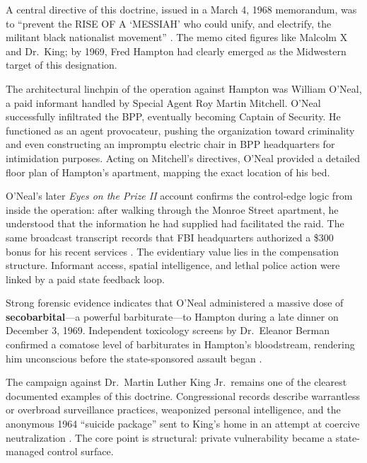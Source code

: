 A central directive of this doctrine, issued in a March 4, 1968 memorandum, was to ``prevent the RISE OF A `MESSIAH' who could unify, and electrify, the militant black nationalist movement'' \cite{fbi_cointelpro_vault}. The memo cited figures like Malcolm X and Dr.\ King; by 1969, Fred Hampton had clearly emerged as the Midwestern target of this designation.

The architectural linchpin of the operation against Hampton was William O'Neal, a paid informant handled by Special Agent Roy Martin Mitchell. O'Neal successfully infiltrated the BPP, eventually becoming Captain of Security. He functioned as an agent provocateur, pushing the organization toward criminality and even constructing an impromptu electric chair in BPP headquarters for intimidation purposes. Acting on Mitchell's directives, O'Neal provided a detailed floor plan of Hampton's apartment, mapping the exact location of his bed.

O'Neal's later \textit{Eyes on the Prize II} account confirms the control-edge logic from inside the operation: after walking through the Monroe Street apartment, he understood that the information he had supplied had facilitated the raid. The same broadcast transcript records that FBI headquarters authorized a \$300 bonus for his recent services \cite{eyes_on_prize_nation_law_transcript}. The evidentiary value lies in the compensation structure. Informant access, spatial intelligence, and lethal police action were linked by a paid state feedback loop.

Strong forensic evidence indicates that O'Neal administered a massive dose of \textbf{secobarbital}---a powerful barbiturate---to Hampton during a late dinner on December 3, 1969. Independent toxicology screens by Dr.\ Eleanor Berman confirmed a comatose level of barbiturates in Hampton's bloodstream, rendering him unconscious before the state-sponsored assault began \cite{hampton_bio}.

The campaign against Dr.\ Martin Luther King Jr.\ remains one of the clearest documented examples of this doctrine. Congressional records describe warrantless or overbroad surveillance practices, weaponized personal intelligence, and the anonymous 1964 ``suicide package'' sent to King's home in an attempt at coercive neutralization \cite{church_book2_1976}. The core point is structural: private vulnerability became a state-managed control surface.

